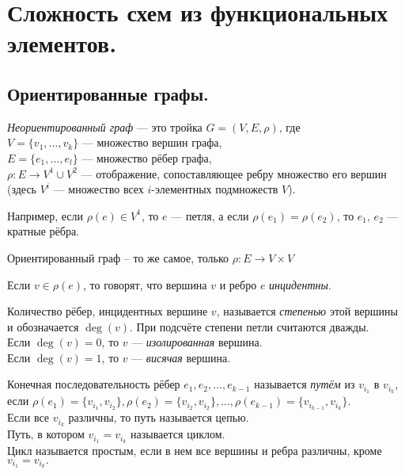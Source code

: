 \section{Сложность схем из функциональных элементов.}
\subsection{Ориентированные графы.}
\begin{df} 
\textit{Неориентированный граф} --- это тройка $G = (V, E, \rho)$, где\\
$V = \{v_1, \dots, v_k\}$ --- множество вершин графа,\\
$E = \{e_1, \dots, e_l\}$ --- множество рёбер графа,\\ 
$\rho\colon E \rightarrow V^1 \cup V^2$ --- отображение, сопоставляющее ребру множество его вершин (здесь $V^i$ --- множество всех $i$-элементных подмножеств $V$).
\end{df}
\noindent Например, если $\rho(e) \in V^1$, то $e$ --- петля, а если $\rho(e_1) = \rho(e_2)$, то $e_1,\,e_2$ --- кратные рёбра.

\begin{df}
Ориентированный граф -- то же самое, только $\rho: E \rightarrow V \times V$
\end{df}

\begin{df}
Если $v\in \rho(e)$, то говорят, что вершина $v$ и ребро $e$ \textit{инцидентны}.
\end{df}

\begin{df}
Количество рёбер, инцидентных вершине $v$, называется \textit{степенью} этой вершины и обозначается $\deg(v)$. При подсчёте степени петли считаются дважды.\\
Если $\deg(v) = 0$, то $v$ --- \textit{изолированная} вершина.\\
Если $\deg(v) = 1$, то $v$ --- \textit{висячая} вершина.
\end{df}

\begin{df}
Конечная последовательность рёбер $e_1, e_2, \ldots, e_{k-1}$ называется \textit{путём} из $v_{i_1}$ в $v_{i_k}$, если $\rho(e_1) = \{v_{i_1}, v_{i_2}\},\rho(e_2) = \{v_{i_2}, v_{i_2}\} , \ldots, \rho(e_{k-1}) = \{v_{i_{k-1}}, v_{i_k}\}$.\\
Если все $v_{i_k}$ различны, то путь называется цепью.\\
Путь, в котором $v_{i_1} = v_{i_k}$ называется циклом.\\
Цикл называется простым, если в нем все вершины и ребра различны, кроме $v_{i_1} = v_{i_k}.$
\end{df}

